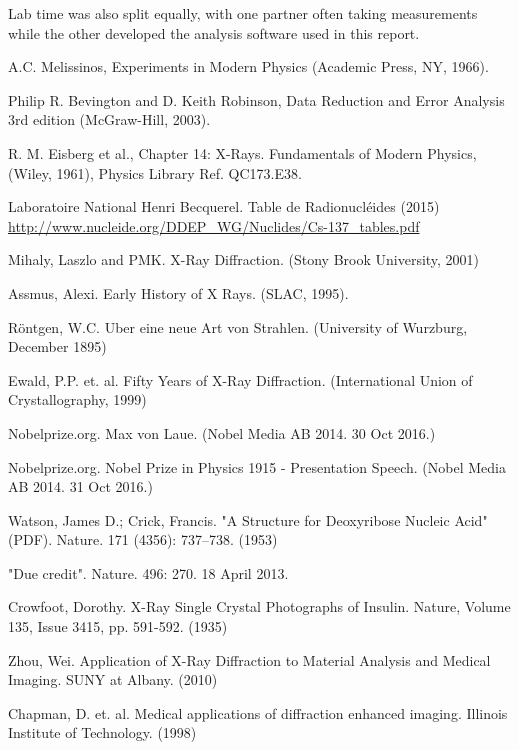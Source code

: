 \documentclass[%
 reprint,
 amsmath,amssymb,
 aps,
 pra,
]{revtex4-1}
\begin{document}
\noindent Lab time was also split equally, with one partner often taking measurements while the other developed the analysis software used in this report.

\begin{thebibliography}{6}
	
	A.C. Melissinos, Experiments in Modern Physics (Academic Press, NY, 1966).
	
	Philip R. Bevington and D. Keith Robinson, Data Reduction and Error Analysis 3rd edition (McGraw-Hill, 2003).
	
	R. M. Eisberg et al., Chapter 14: X-Rays. Fundamentals of Modern Physics,  (Wiley, 1961), Physics Library Ref. QC173.E38.

	Laboratoire National Henri Becquerel. Table de Radionucléides (2015) \url{http://www.nucleide.org/DDEP_WG/Nuclides/Cs-137_tables.pdf}
	
	Mihaly, Laszlo and PMK. X-Ray Diffraction. (Stony Brook University, 2001)
	
	Assmus, Alexi. Early History of X Rays. (SLAC, 1995).
	
	R\"{o}ntgen, W.C. Uber eine neue Art von Strahlen. (University of Wurzburg, December 1895)
	
	Ewald, P.P. et. al. Fifty Years of X-Ray Diffraction. (International Union of Crystallography, 1999)
	
	Nobelprize.org. Max von Laue.  (Nobel Media AB 2014. 30 Oct 2016.)
	
	Nobelprize.org. Nobel Prize in Physics 1915 - Presentation Speech. (Nobel Media AB 2014. 31 Oct 2016.)
	
	Watson, James D.; Crick, Francis. "A Structure for Deoxyribose Nucleic Acid" (PDF). Nature. 171 (4356): 737–738. (1953)
	
	 "Due credit". Nature. 496: 270. 18 April 2013.
	 
	 Crowfoot, Dorothy. X-Ray Single Crystal Photographs of Insulin. Nature, Volume 135, Issue 3415, pp. 591-592. (1935)
	 
	 Zhou, Wei. Application of X-Ray Diffraction to Material Analysis and Medical Imaging. SUNY at Albany. (2010)
	 
	 Chapman, D. et. al. Medical applications of diffraction enhanced imaging. Illinois Institute of Technology. (1998)
	 

\end{thebibliography}
\end{document}
